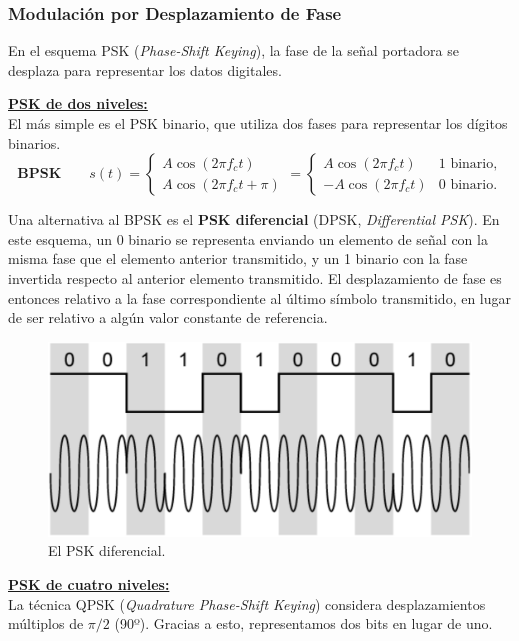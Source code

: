 \documentclass[10pt,a4paper]{article}
\begin{document}
\subsubsection{Modulación por Desplazamiento de Fase}
En el esquema PSK (\textit{Phase-Shift Keying}), la fase de la señal portadora se desplaza para representar los datos digitales.

\underline{\textbf{PSK de dos niveles:}}\\
El más simple es el PSK binario, que utiliza dos fases para representar los dígitos binarios.
\[\mathbf{BPSK} \qquad
 s(t) = \begin{cases}
        A \cos(2\pi f_c t) \\
        A \cos(2\pi f_c t + \pi) 
        \end{cases}
      = \begin{cases}
        A \cos(2\pi f_c t)  & \text{1 binario,}\\
        - A \cos(2\pi f_c t) & \text{0 binario.}
        \end{cases}
\]

Una alternativa al BPSK es el \textbf{PSK diferencial} (DPSK, \textit{Differential PSK}). En este esquema, un 0 binario se representa enviando un elemento de señal con la misma fase que el elemento anterior transmitido, y un 1 binario con la fase invertida respecto al anterior elemento transmitido. El desplazamiento de fase es entonces relativo a la fase correspondiente al último símbolo transmitido, en lugar de ser relativo a algún valor constante de referencia.

\begin{figure}[ht!]
  \caption{El PSK diferencial.}
  \label{fig:pskd}  
  \centerline{
	\includegraphics[width=0.5\textwidth-\fboxrule-\fboxrule]{imgs/pskd.png}}
\end{figure}

\underline{\textbf{PSK de cuatro niveles:}}\\
La técnica QPSK (\textit{Quadrature Phase-Shift Keying}) considera desplazamientos múltiplos de $\pi/2$ (90º). Gracias a esto, representamos dos bits en lugar de uno.
\end{document}
